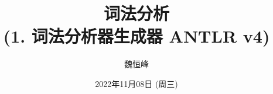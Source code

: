 \documentclass[]{beamer}
\title[词法分析]{词法分析 \\ (1. 词法分析器生成器 ANTLR v4)}
\author[魏恒峰]{\large 魏恒峰}
\institute{hfwei@nju.edu.cn}
\date{2022年11月08日 (周三)}
\begin{document}
\maketitle





\thankyou{}

\end{document}
